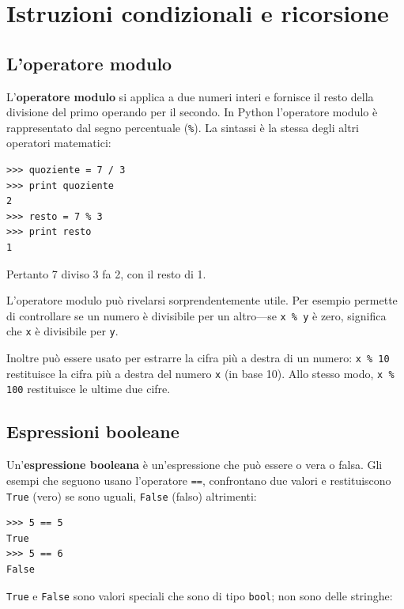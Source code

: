 \documentclass[10pt]{book}
\begin{document}
\chapter{Istruzioni condizionali e ricorsione}

\section{L'operatore modulo}

L'{\bf operatore modulo} si applica a due numeri interi e
   fornisce il resto della divisione del primo operando per il
   secondo. In Python l'operatore modulo è rappresentato dal segno
   percentuale (\verb"%").  La sintassi è la stessa degli altri operatori
   matematici:

\begin{verbatim}
>>> quoziente = 7 / 3
>>> print quoziente
2
>>> resto = 7 % 3
>>> print resto
1
\end{verbatim}
%
Pertanto 7 diviso 3 fa 2, con il resto di 1.

L'operatore modulo può rivelarsi sorprendentemente utile. Per esempio permette di controllare se un numero è divisibile per un altro---se
{\tt x \% y} è zero, significa che {\tt x} è divisibile per {\tt y}.

Inoltre può essere usato per estrarre la cifra più a destra di un numero: {\tt x \% 10} restituisce la cifra più a destra del numero {\tt x} (in base 10). Allo stesso modo, {\tt x \% 100} restituisce le ultime due cifre.


\section{Espressioni booleane}

Un'{\bf espressione booleana} è un'espressione che può essere o vera o falsa.  Gli esempi che seguono usano l'operatore {\tt ==}, confrontano due valori e restituiscono {\tt True} (vero) se sono uguali, {\tt False} (falso) altrimenti:

\begin{verbatim}
>>> 5 == 5
True
>>> 5 == 6
False
\end{verbatim}
%
{\tt True} e {\tt False} sono valori speciali che sono di tipo {\tt bool}; non sono delle stringhe:
\end{document}
